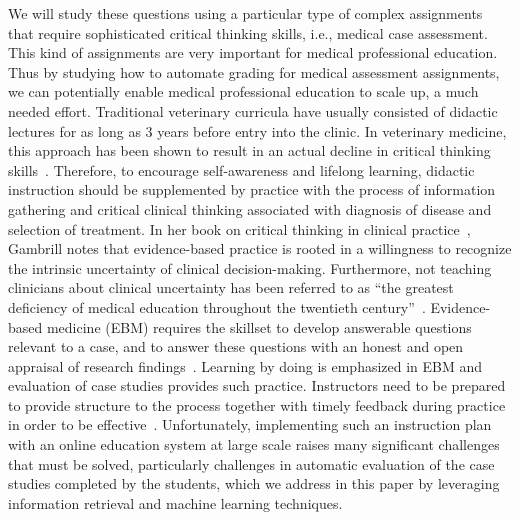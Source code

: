 We will study these questions using a particular type of complex assignments that require sophisticated critical thinking skills, i.e., medical case assessment. This kind of assignments are very important for medical professional education. Thus by studying 
how to automate grading for medical assessment assignments, we can potentially enable medical professional education to scale up, a much needed effort. Traditional
veterinary curricula have usually consisted of didactic lectures for as
long as 3 years before entry into the clinic. In veterinary medicine, this approach has been shown
to result in an actual decline in critical thinking
skills~\cite{Herron:1992}. Therefore, to encourage self-awareness and
lifelong learning, didactic instruction should be supplemented by practice
with the process of information gathering and critical clinical thinking
associated with diagnosis of disease and selection of treatment. In her
book on critical thinking in clinical practice~\cite{Gambrill:2005},
Gambrill notes that evidence-based practice is rooted in a willingness
to recognize the intrinsic uncertainty of
clinical decision-making.  
Furthermore, not teaching clinicians about clinical uncertainty has
been referred to as ``the greatest deficiency of medical education
throughout the twentieth century''~\cite{Djulbegovic:2004, Gambrill:2005}.
Evidence-based medicine (EBM) requires the skillset to develop answerable
questions relevant to a case, and to answer these questions with an honest
and open appraisal of research findings~\cite{Braddock:1999}.  
Learning by doing is emphasized in EBM and evaluation of case
studies provides such practice. Instructors need to be prepared to provide
structure to the process together with timely feedback during practice in
order to be effective~\cite{Gambrill:2005}. Unfortunately, implementing
such an instruction plan with an online education system at large scale
raises many significant challenges that must be solved, particularly
challenges in automatic evaluation of the case studies completed by the
students, which we address in this paper by leveraging information
retrieval and machine learning techniques. 

